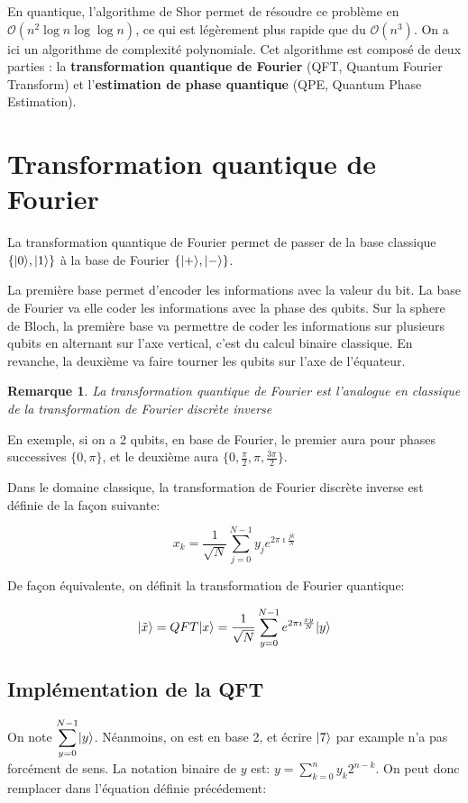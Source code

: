 \documentclass[12pt,a4paper]{article}
\DeclarePairedDelimiter\ket{\lvert}{\rangle}
\newtheorem{rem}{Remarque}
\begin{document}
En quantique, l'algorithme de Shor permet de résoudre ce problème en $\mathcal{O}(n^2 \log n \log \log n)$, ce qui est légèrement plus rapide que du $\mathcal{O}(n^3)$. On a ici un algorithme de complexité polynomiale. Cet algorithme est composé de deux parties : la \textbf{transformation quantique de Fourier} (QFT, Quantum Fourier Transform) et l'\textbf{estimation de phase quantique} (QPE, Quantum Phase Estimation).

\section{Transformation quantique de Fourier}

La transformation quantique de Fourier permet de passer de la base classique $\{\ket{0}, \ket{1}\}$ à la base de Fourier $\{\ket{+}, \ket{-}\}$.

La première base permet d'encoder les informations avec la valeur du bit. La base de Fourier va elle coder les informations avec la phase des qubits. Sur la sphere de Bloch, la première base va permettre de coder les informations sur plusieurs qubits en alternant sur l'axe vertical, c'est du calcul binaire classique. En revanche, la deuxième va faire tourner les qubits sur l'axe de l'équateur.


\begin{rem}
  La transformation quantique de Fourier est l'analogue en classique de la transformation de Fourier discrète inverse
\end{rem}

En exemple, si on a 2 qubits, en base de Fourier, le premier aura pour phases successives $\{0, \pi\}$, et le deuxième aura $\{0, \frac{\pi}{2}, \pi, \frac{3\pi}{2}\}$.


Dans le domaine classique, la transformation de Fourier discrète inverse est définie de la façon suivante:

\[ x_k = \frac{1}{\sqrt{N}} \displaystyle\sum_{j=0}^{N-1} y_j e^{2 \pi \imath \frac{j k}{N}}  \]

De façon équivalente, on définit la transformation de Fourier quantique:

\[ \ket{\tilde{x}} = QFT\ket{x} = \frac{1}{\sqrt{N}} \displaystyle\sum_{y=0}^{N-1} e^{2 \pi \imath \frac{x y}{N}} \ket{y}  \]

\subsection{Implémentation de la QFT}
On note $\displaystyle\sum_{y=0}^{N-1} \ket{y}$. Néanmoins, on est en base 2, et écrire $\ket{7}$ par example n'a pas forcément de sens. La notation binaire de $y$ est: $y=\displaystyle\sum_{k=0}^{n} y_k 2^{n-k}$. On peut donc remplacer dans l'équation définie précédement:
\end{document}
